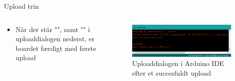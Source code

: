 \documentclass[aspectratio=169]{beamer}
\begin{document}
\begin{frame}{Upload trin}
\begin{columns}

	\begin{column}{0.5\textwidth}
		\begin{textBox}
			\begin{itemize}
				\item Når der står "", samt "" i uploaddialogen nederst, er boardet færdigt med første upload
			\end{itemize}
		\end{textBox}
	\end{column}
	
	\begin{column}{0.5\textwidth}
		\begin{figure}
  			\includegraphics[width=\textwidth,keepaspectratio=true]{assets/pictures/doneuploading.png}
  			\caption{Uploaddialogen i Arduino IDE efter et succesfuldt upload}
  			\label{fig:doneuploading}
		\end{figure}
	\end{column}
	
\end{columns}
\end{frame}
\end{document}
